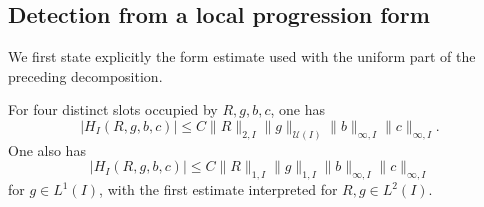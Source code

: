 \subsection{Detection from a local progression form}

We first state explicitly the form estimate used with the uniform part
of the preceding decomposition.

\begin{lemma}
\label{lem:local-von-neumann}
For four distinct slots occupied by \(R,g,b,c\), one has
\[
 |H_I(R,g,b,c)|
   \le C\|R\|_{2,I}\|g\|_{\mathcal U(I)}
                      \|b\|_{\infty,I}\|c\|_{\infty,I}.
\]
One also has
\[
 |H_I(R,g,b,c)|
   \le C\|R\|_{1,I}\|g\|_{1,I}
                      \|b\|_{\infty,I}\|c\|_{\infty,I}
\]
for \(g\in L^1(I)\), with the first estimate interpreted for
\(R,g\in L^2(I)\).
\end{lemma}

